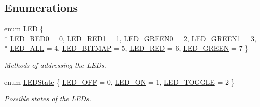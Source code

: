 \subsection*{Enumerations}
\begin{DoxyCompactItemize}
\item 
enum \hyperlink{group__xycontrol_gaadcb6002d2b42fdfe01490f730ab00a6}{L\-E\-D} \{ \\*
\hyperlink{group__xycontrol_ggaadcb6002d2b42fdfe01490f730ab00a6abd50485e17442a345888be61d2074c40}{L\-E\-D\-\_\-\-R\-E\-D0} = 0, 
\hyperlink{group__xycontrol_ggaadcb6002d2b42fdfe01490f730ab00a6af706e3dc22e0cbc5d3c38bb45ee35922}{L\-E\-D\-\_\-\-R\-E\-D1} = 1, 
\hyperlink{group__xycontrol_ggaadcb6002d2b42fdfe01490f730ab00a6a9360f305ce504b55ff68922bab599c38}{L\-E\-D\-\_\-\-G\-R\-E\-E\-N0} = 2, 
\hyperlink{group__xycontrol_ggaadcb6002d2b42fdfe01490f730ab00a6a213b05e94b12e0bcee53b6de3df294f8}{L\-E\-D\-\_\-\-G\-R\-E\-E\-N1} = 3, 
\\*
\hyperlink{group__xycontrol_ggaadcb6002d2b42fdfe01490f730ab00a6ae4fd580189cac85429ebfa5cb71cd772}{L\-E\-D\-\_\-\-A\-L\-L} = 4, 
\hyperlink{group__xycontrol_ggaadcb6002d2b42fdfe01490f730ab00a6a2a797d26a32fb3bdc0f975e6955e2873}{L\-E\-D\-\_\-\-B\-I\-T\-M\-A\-P} = 5, 
\hyperlink{group__xycontrol_ggaadcb6002d2b42fdfe01490f730ab00a6ad80f13022b6d309268fadc7b1da89cb9}{L\-E\-D\-\_\-\-R\-E\-D} = 6, 
\hyperlink{group__xycontrol_ggaadcb6002d2b42fdfe01490f730ab00a6a0ad916c7f80666dc88f6b5b22a72e742}{L\-E\-D\-\_\-\-G\-R\-E\-E\-N} = 7
 \}
\begin{DoxyCompactList}\small\item\em Methods of addressing the L\-E\-Ds. \end{DoxyCompactList}\item 
enum \hyperlink{group__xycontrol_ga51a69e0b98357e170e63bc843e2fd1c0}{L\-E\-D\-State} \{ \hyperlink{group__xycontrol_gga51a69e0b98357e170e63bc843e2fd1c0afc0ca8cc6cbe215fd3f1ae6d40255b40}{L\-E\-D\-\_\-\-O\-F\-F} = 0, 
\hyperlink{group__xycontrol_gga51a69e0b98357e170e63bc843e2fd1c0add01b80eb93658fb4cf7eb9aceb89a1d}{L\-E\-D\-\_\-\-O\-N} = 1, 
\hyperlink{group__xycontrol_gga51a69e0b98357e170e63bc843e2fd1c0a1b3bca014fbbfe339c8e216d175bae2e}{L\-E\-D\-\_\-\-T\-O\-G\-G\-L\-E} = 2
 \}
\begin{DoxyCompactList}\small\item\em Possible states of the L\-E\-Ds. \end{DoxyCompactList}\end{DoxyCompactItemize}
